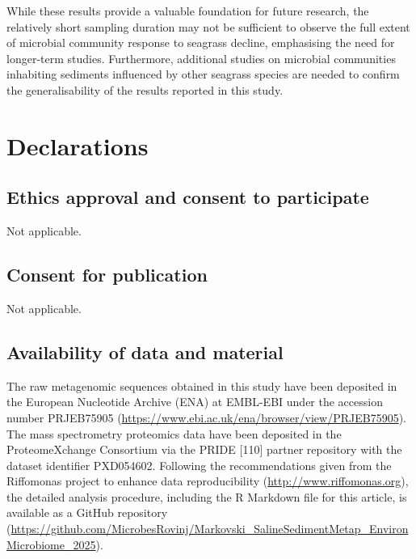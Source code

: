 \documentclass[
  12 pt,
]{article}
\begin{document}
While these results provide a valuable foundation for future research, the relatively short sampling duration may not be sufficient to observe the full extent of microbial community response to seagrass decline, emphasising the need for longer-term studies. Furthermore, additional studies on microbial communities inhabiting sediments influenced by other seagrass species are needed to confirm the generalisability of the results reported in this study.

\hypertarget{declarations}{%
\section{Declarations}\label{declarations}}

\hypertarget{ethics-approval-and-consent-to-participate}{%
\subsection{Ethics approval and consent to participate}\label{ethics-approval-and-consent-to-participate}}

\noindent
Not applicable.

\hypertarget{consent-for-publication}{%
\subsection{Consent for publication}\label{consent-for-publication}}

\noindent
Not applicable.

\hypertarget{availability-of-data-and-material}{%
\subsection{Availability of data and material}\label{availability-of-data-and-material}}

The raw metagenomic sequences obtained in this study have been deposited in the European Nucleotide Archive (ENA) at EMBL-EBI under the accession number PRJEB75905 (\url{https://www.ebi.ac.uk/ena/browser/view/PRJEB75905}). The mass spectrometry proteomics data have been deposited in the ProteomeXchange Consortium via the PRIDE {[}110{]} partner repository with the dataset identifier PXD054602. Following the recommendations given from the Riffomonas project to enhance data reproducibility (\url{http://www.riffomonas.org}), the detailed analysis procedure, including the R Markdown file for this article, is available as a GitHub repository (\url{https://github.com/MicrobesRovinj/Markovski_SalineSedimentMetap_EnvironMicrobiome_2025}).
\end{document}
